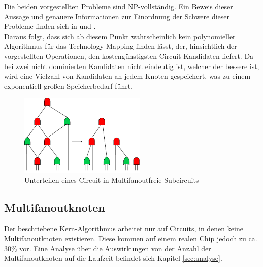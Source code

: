 \documentclass[11pt, a4paper, german]{article}
\newcommand{\TM}{Technology  Mapping }
\begin{document}
Die beiden vorgestellten Probleme sind NP-vollständig. Ein Beweis dieser Aussage und genauere Informationen zur Einordnung der Schwere dieser Probleme finden sich in \cite{ComplexitySynthesis} und \citep{Elbert}. \\
Daraus folgt, dass sich ab diesem Punkt wahrscheinlich  kein polynomieller Algorithmus für das \TM finden lässt, der, hinsichtlich der vorgestellten Operationen, den kostengünstigsten Circuit-Kandidaten liefert.
Da bei zwei nicht dominierten Kandidaten nicht eindeutig ist, welcher der bessere ist,  wird eine Vielzahl von Kandidaten an jedem Knoten gespeichert, was zu einem exponentiell großen Speicherbedarf führt. 
 \begin{figure}
		\includegraphics[width = 6cm]{pictures/compiled/ohne_highfanout_heu}
		\caption{Unterteilen eines Circuit in Multifanoutfreie Subcircuits}
		\label{bild:ohne_multifanout_heu}
\end{figure}
\subsection{Multifanoutknoten}
\label{subsec:multifanout}
Der beschriebene Kern-Algorithmus arbeitet nur auf Circuits, in denen keine Multifanoutknoten existieren. Diese kommen auf einem realen Chip jedoch zu ca. $30\%$ vor.
Eine Analyse über die Auswirkungen von der Anzahl der Multifanoutknoten auf die Laufzeit befindet sich Kapitel \ref{sec:analyse}.
\end{document}
